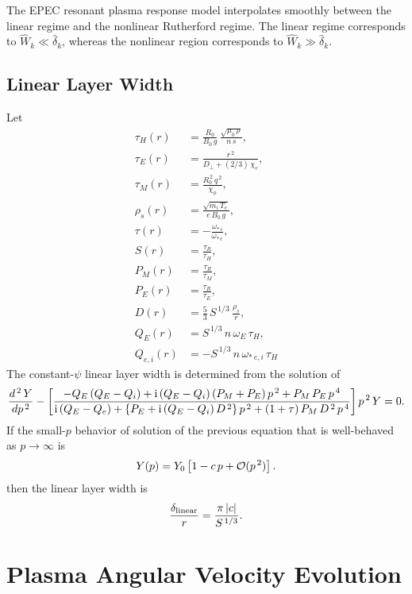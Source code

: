 \documentclass[notitlepage,12pt]{article}
\begin{document}
The EPEC resonant plasma response model interpolates smoothly
between the linear regime and the
nonlinear Rutherford regime. The linear regime corresponds to $\hat{W}_k\ll\hat{\delta}_k$, whereas the nonlinear
region corresponds to $\hat{W}_k\gg\hat{\delta}_k$.  

\subsection{Linear Layer Width}\label{linear}
Let
\begin{align}
\tau_H(r) &= \frac{R_0}{B_0\,g}\,\frac{\sqrt{\mu_0\,\rho}}{n\,s},\\[0.5ex]
\tau_E(r) &= \frac{r^{\,2}}{D_\perp + (2/3)\,\chi_e},\\[0.5ex]
\tau_M(r) &= \frac{R_0^{\,2}\,q^{\,2}}{\chi_\phi},\\[0.5ex]
\rho_s (r)&= \frac{\sqrt{m_i\,T_e}}{e\,B_0\,g},\\[0.5ex]
\tau(r)& = -\frac{\omega_{\ast\,i}}{\omega_{\ast\,e}},\\[0.5ex]
S(r) &= \frac{\tau_R}{\tau_H},\\[0.5ex]
P_M(r) &= \frac{\tau_R}{\tau_M},\\[0.5ex]
P_E(r) &= \frac{\tau_R}{\tau_E},\\[0.5ex]
D(r)&= \frac{5}{3}\,S^{\,1/3}\,\frac{\rho_s}{r},\\[0.5ex]
Q_E(r)&= S^{\,1/3}\,n\,\omega_E\,\tau_H,\\[0.5ex]
Q_{e,i}(r)&= -S^{\,1/3}\,n\,\omega_{\ast\,e,i}\,\tau_H
\end{align}
The constant-$\psi$ linear layer width is determined from the solution of
\begin{equation}
\frac{d^{\,2}\,Y}{dp^{\,2}} -\left[\frac{-Q_E\,(Q_E-Q_i)+{\rm i}\,(Q_E-Q_i)\,(P_M+P_E)\,p^{\,2}+
P_M\,P_E\,p^{\,4}}
{{\rm i}\,(Q_E-Q_e) +\{P_E + {\rm i}\,(Q_E-Q_i)\,D^{\,2}\}\,p^{\,2}+(1+\tau)\,P_M\,D^{\,2}\,p^{\,4}}
\right] p^{\,2}\, Y = 0.
\end{equation}
If the small-$p$ behavior of solution of the previous equation that is well-behaved as $p\rightarrow \infty$ is
\begin{equation}
Y(p) = Y_0\left[1 - c\,p+{\cal O}(p^{\,2})\right].
\end{equation}
then the 
linear layer width is 
\begin{equation}
\frac{\delta_{\rm linear}}{r} = \frac{\pi\,|c|}{S^{\,1/3}}.
\end{equation}

\section{Plasma Angular Velocity Evolution}\label{a4}
\end{document}
